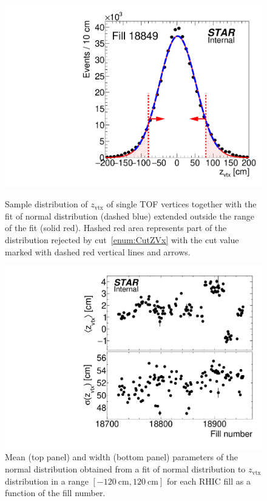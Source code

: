 \begin{figure}[ht!]%
\centering%
\begin{minipage}{.4725\textwidth}%
  \centering%
  \includegraphics[width=\linewidth]{graphics/corrections/sampleZVtxHist.pdf}%
  \caption[Sample distribution of $z_{\text{vtx}}$ with fitted normal distribution.]{Sample distribution of $z_{\text{vtx}}$ of single TOF vertices together with the fit of normal distribution (dashed blue) extended outside the range of the fit (solid red). Hashed red area represents part of the distribution rejected by cut~\ref{enum:CutZVx} with the cut value marked with dashed red vertical lines and arrows.}\label{fig:sampleZVtxHist}
\end{minipage}%
\quad\quad%
\begin{minipage}{.4725\textwidth}%
  \centering
  \includegraphics[width=\linewidth]{graphics/corrections/zVxMeanAndSigmaVsFillNumber.pdf}%
  \caption[Mean and width of the $z_{\text{vtx}}$ distribution as a function of the RHIC fill number.]{Mean (top panel) and width (bottom panel) parameters of the normal distribution obtained from a fit of normal distribution to $z_{\text{vtx}}$ distribution in a range $[-120~\text{cm}, 120~\text{cm}]$ for each RHIC fill as a function of the fill number.\newline}\label{fig:zVxMeanAndSigmaVsFillNumber}
\end{minipage}%
\end{figure}%


